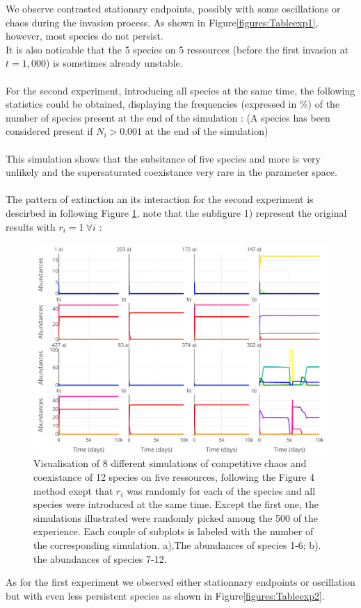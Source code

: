 We observe contrasted stationary endpoints, possibly with some oscillations or 
chaos during the invasion process. As shown in Figure\ref{figures:Tableexp1}, 
however, most species do not persist.\\
It is also noticable that the 5 species on 5 ressources (before the first 
invasion at $t=1,000$) is sometimes already unstable.\\
\\
For the second experiment, introducing all species at the same time, the 
following statistics could be obtained, displaying the frequencies (expressed in 
\%) of the number of species present at the end of the simulation : (A species 
has been considered present if $N_i > 0.001$ at the end of the simulation) \\


\\
This simulation shows that the subsitance of five species and more is very 
unlikely and the supersaturated coexistance very rare in the parameter space.\\
\\
The pattern of extinction an its interaction for the second experiment is descirbed in following Figure \ref{figures:Figexp2}, 
note that the subfigure 1) represent the original results with $r_i=1 ~\forall 
i$ : 
\begin{figure}[H]
\begin{center} 
 \includegraphics[width=1\textwidth]{../Code/Figures/Figure_exp2.pdf}
  \caption{Visualisation of 8 different simulations of competitive chaos and 
coexistance of 12 species on five ressources, following the Figure 4 method 
exept that $r_i$ was randomly for each of the species and all species were 
introduced at the same time. Except the first one, the simulations illustrated 
were randomly picked among the 500 of the experience. Each couple of subplots is labeled with the number of the corresponding simulation. a),The abundances of 
species 1-6; b). the abundances of species 7-12.}
  \label{figures:Figexp2}
\end{center}
  \end{figure}
As for the first experiment we observed either stationnary endpoints or 
oscillation but with even less persistent species as shown in 
Figure\ref{figures:Tableexp2}.
